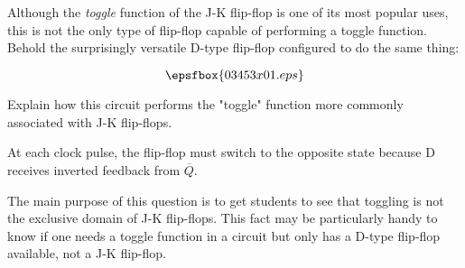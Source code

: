 

Although the {\it toggle} function of the J-K flip-flop is one of its most popular uses, this is not the only type of flip-flop capable of performing a toggle function.  Behold the surprisingly versatile D-type flip-flop configured to do the same thing:

$$\epsfbox{03453x01.eps}$$

Explain how this circuit performs the "toggle" function more commonly associated with J-K flip-flops.







At each clock pulse, the flip-flop must switch to the opposite state because D receives inverted feedback from $\overline{Q}$.







The main purpose of this question is to get students to see that toggling is not the exclusive domain of J-K flip-flops.  This fact may be particularly handy to know if one needs a toggle function in a circuit but only has a D-type flip-flop available, not a J-K flip-flop.




